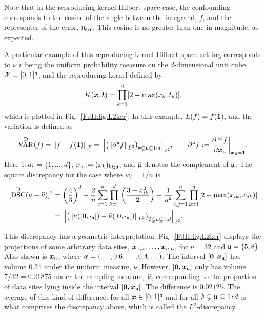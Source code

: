 \documentclass[graybox,footinfo]{svmult}
\DeclareMathOperator{\disc}{DSC}
\DeclareMathOperator{\Var}{VAR}
\begin{document}
Note that in the reproducing kernel Hilbert space case, the confounding corresponds to 
the cosine of the angle between the integrand, $f$, and the representer of the error, 
$\eta_{\textrm{err}}$.  This cosine is no greater than one in magnitude, as expected.

A particular example of this reproducing kernel Hilbert space setting corresponds to 
$\nu$ $v$ being the uniform probability measure on the $d$-dimensional unit cube, $\mathcal{X} 
= 
[0,1]^d$, and the reproducing kernel defined by \cite{Hic97a}
\begin{equation} \label{FJH:eq:L2Kdef}
K(\bsx,\bst) =\prod_{k = 1}^d [2 - \max(x_k,t_k)],
\end{equation}
which is plotted in Fig.\ \ref{FJH:fig:L2ker}.  In this example, $L(f) = f({\boldsymbol{1}})$, and the 
variation is defined as
\begin{equation*}
\Var^\Dt(f)  = \norm{f-f(\bsone)}_\cf = \Bigl \lVert \bigl ( \norm{\partial^\fraku f}_{L^2}\bigr 
)_{\emptyset \subsetneq \fraku \subseteq 1:d} \Bigr \rVert_{\ell^2} , \qquad 
\partial^\fraku f : = \frac{\partial^{\lvert\fraku\rvert} f}{\partial \bsx_\fraku} \biggr 
\rvert_{\bsx_{\bar{\fraku}} = \bsone}.
\end{equation*}
Here $1\!:\!d : = \{1, \ldots, d\}$, $x_{\mathfrak{u}} := (x_k)_{k \in {\mathfrak{u}}}$, and $\bar{{\mathfrak{u}}}$ 
denotes the complement of ${\mathfrak{u}}$.  
The square discrepancy for the case where $w_i = 1/n$ is
\begin{align}
\nonumber
[\disc^\Dt(\nu - \hnu)]^2  &= \left(\frac 43\right)^d - \frac{2}n \sum_{i=1}^n \prod_{k=1}^d 
\left (\frac{3 - x_{ik}^2}{2} \right) + \frac{1}{n^2}\sum_{i,j=1}^n \prod_{k = 1}^d [2 - 
\max(x_{ik},x_{jk})] 
\\ &= \Bigl \lVert \bigl ( \norm{\nu([\bszero,\cdot_\fraku]) - 
	\hnu([\bszero,\cdot_\fraku])}_{L^2}\bigr )_{\emptyset \subsetneq \fraku \subseteq 1:d} 
	\Bigr 
	\rVert_{\ell^2}. \label{FJH:eq:L2disc}
\end{align}

This discrepancy has a geometric interpretation. Fig.\ \ref{FJH:fig:L2ker} displays the 
projections of some arbitrary 
data sites, ${\boldsymbol{x}}_{1,{\mathfrak{u}}}, \ldots, {\boldsymbol{x}}_{n,{\mathfrak{u}}}$, for $n=32$ and ${\mathfrak{u}} = \{5,8\}$.  
Also 
shown is ${\boldsymbol{x}}_{\mathfrak{u}}$, where ${\boldsymbol{x}} = (\ldots, 0.6, \ldots, 0.4, \ldots)$. The interval 
$[{\boldsymbol{0}},{\boldsymbol{x}}_{\mathfrak{u}}]$ has volume $0.24$ under the uniform measure, $\nu$, However, 
$[{\boldsymbol{0}},{\boldsymbol{x}}_{\mathfrak{u}}]$ only has 
volume $7/32 = 0.21875$ under the sampling measure, $\widehat{\nu}$, corresponding to the 
proportion of data sites lying inside the interval $[{\boldsymbol{0}},{\boldsymbol{x}}_{\mathfrak{u}}]$. The difference is 
$0.02125$.  The average of this kind of difference, for all ${\boldsymbol{x}} \in [0,1]^d$ and for all 
$\emptyset \subsetneq {\mathfrak{u}} 
\subseteq 1\!:\!d$ is what comprises the discrepancy above, which is called the 
$L^2$-discrepancy.
\end{document}
